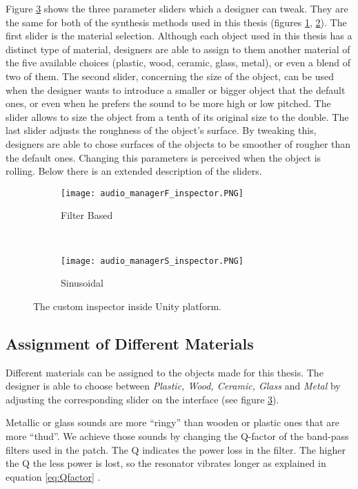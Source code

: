 Figure \ref{fig:custom_insp} shows the three parameter sliders which a designer can tweak. They are the same for both of the synthesis methods  used in this thesis (figures \ref{fig:FB}, \ref{fig:sin}). The first slider is the material selection. Although each object used in this thesis has a distinct type of material, designers are able to assign to them another material of the five available choices (plastic, wood, ceramic, glass, metal), or even a blend of two of them. The second slider, concerning the size of the object, can be used when the designer wants to introduce a smaller or bigger object that the default ones, or even when he prefers the sound to be more high or low pitched. The slider allows to size the object from a tenth of its original size to the double. The last slider adjusts the roughness of the object's surface. By tweaking this, designers are able to chose surfaces of the objects to be smoother of rougher than the default ones. Changing this parameters is perceived when the object is rolling. Below there is an extended description of the sliders.

\begin{figure}[H]
    \centering
    \begin{subfigure}[b]{0.45\textwidth}
        \texttt{[image: audio\_managerF\_inspector.PNG]}
        \caption{Filter Based}
        \label{fig:FB}
    \end{subfigure}
    ~ %
    \begin{subfigure}[b]{0.45\textwidth}
        \texttt{[image: audio\_managerS\_inspector.PNG]}
        \caption{Sinusoidal}
        \label{fig:sin}
    \end{subfigure}
    \caption{The custom inspector inside Unity\textsuperscript{\textregistered} platform.}\label{fig:custom_insp}
\end{figure}

\subsection{Assignment of Different Materials}
Different materials can be assigned to the objects made for this thesis. The designer is able to choose between \textit{Plastic, Wood, Ceramic, Glass} and \textit{Metal} by adjusting the corresponding slider on the interface (see figure \ref{fig:custom_insp}). 

Metallic or glass sounds are more ``ringy'' than wooden or plastic ones that are more ``thud''. We achieve those sounds by changing the Q-factor of the band-pass filters used in the  patch. The \gls{Q} indicates the power loss in the filter. The higher the \gls{Q} the less power is lost, so the resonator vibrates longer as explained in equation \ref{eq:Qfactor} \cite{bib:Q}.

